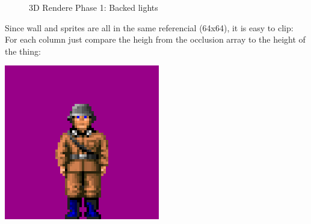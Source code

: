   \begin{figure}[H]
\centering
 
 \caption{3D Rendere Phase 1: Backed lights} \label{fig:backee_lights}
 \end{figure}


\par
Since wall and sprites are all in the same referencial (64x64), it is easy to clip: For each column just compare the heigh from the occlusion array to the height of the thing:\\
\par
  \begin{minipage}{.5\textwidth}
     \includegraphics[width=\textwidth]{screenshots/guard_sprite.png}
  \end{minipage}
